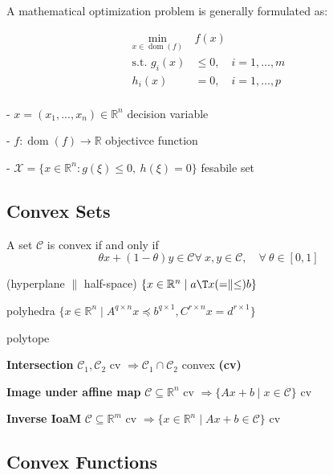A mathematical optimization problem is generally formulated as:

\begin{equation}
	\begin{aligned}
		\min_{x\in\operatorname{dom}(f)}          & f(x)                      \\
		\text{s.t. }                       g_i(x) & \le 0,\quad i = 1,\dots,m \\
		h_i(x)                                    & = 0,\quad i = 1,\dots,p   \\
	\end{aligned}
	\label{eq:optimization}
\end{equation}

- $x = (x_1,...,x_n) \in \mathbb{R}^{n}$ decision variable

- $f: \operatorname{dom}(f)\to\mathbb{R}$ objectivce function

- $\mathcal{X} = \{x \in \mathbb{R}^{n}: g(\xi)\le0,\ h(\xi)=0\}$ fesabile set


\subsection{Convex Sets}

\begin{definition}
	A set $\mathcal{C}$ is convex if and only if
	$$\theta x + (1-\theta)y \in \mathcal{C}
		\forall\ x,y \in \mathcal{C},\quad
		\forall\ \theta \in [0,1]$$
\end{definition}

(hyperplane $\parallel$ half-space)
$\{x \in \mathbb{R}^n \mid a\T x(=\parallel\le)b\}$

polyhedra $\{x\in\mathbb{R}^n\mid A^{q\times n}x\preceq b^{q\times1},C^{r\times n}x=d^{r\times1}\}$

polytope



\textbf{Intersection}
$\mathcal{C}_1, \mathcal{C}_2$ cv
$\Rightarrow \mathcal{C}_1 \cap \mathcal{C}_2$ convex \textbf{(cv)}

\textbf{Image under affine map}
$\mathcal{C} \subseteq  \mathbb{R}^{n}$ cv
$\Rightarrow \{Ax+b \mid x \in \mathcal{C} \}$ cv

\textbf{Inverse IoaM}
$\mathcal{C} \subseteq  \mathbb{R}^{m}$ cv
$\Rightarrow \{x\in\mathbb{R}^{n} \mid  Ax+b\in\mathcal{C}\}$ cv

\subsection{Convex Functions}


